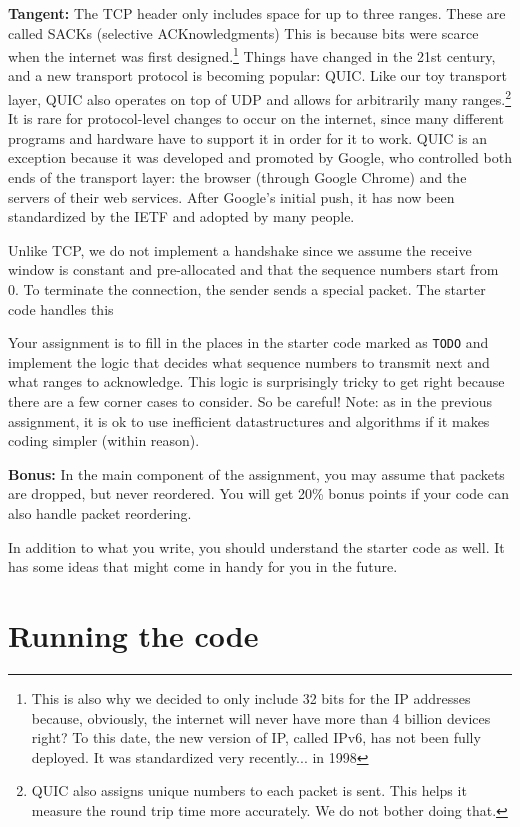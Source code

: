 \documentclass{article}
\begin{document}
\noindent\textbf{Tangent:} The TCP header only includes space for up to three ranges. These are called SACKs (selective ACKnowledgments) This is because bits were scarce when the internet was first designed.\footnote{This is also why we decided to only include 32 bits for the IP addresses because, obviously, the internet will never have more than 4 billion devices right? To this date, the new version of IP, called IPv6, has not been fully deployed. It was standardized very recently... in 1998} Things have changed in the 21st century, and a new transport protocol is becoming popular: QUIC. Like our toy transport layer, QUIC also operates on top of UDP and allows for arbitrarily many ranges.\footnote{QUIC also assigns unique numbers to each packet is sent. This helps it measure the round trip time more accurately. We do not bother doing that.} It is rare for protocol-level changes to occur on the internet, since many different programs and hardware have to support it in order for it to work. QUIC is an exception because it was developed and promoted by Google, who controlled both ends of the transport layer: the browser (through Google Chrome) and the servers of their web services. After Google's initial push, it has now been standardized by the IETF and adopted by many people.

Unlike TCP, we do not implement a handshake since we assume the receive window is constant and pre-allocated and that the sequence numbers start from 0. To terminate the connection, the sender sends a special packet. The starter code handles this

Your assignment is to fill in the places in the starter code marked as {\tt TODO} and implement the logic that decides what sequence numbers to transmit next and what ranges to acknowledge. This logic is surprisingly tricky to get right because there are a few corner cases to consider. So be careful! Note: as in the previous assignment, it is ok to use inefficient datastructures and algorithms if it makes coding simpler (within reason).

\noindent\textbf{Bonus:} In the main component of the assignment, you may assume that packets are dropped, but never reordered. You will get 20\% bonus points if your code can also handle packet reordering.

In addition to what you write, you should understand the starter code as well. It has some ideas that might come in handy for you in the future.

\section{Running the code}
\end{document}
